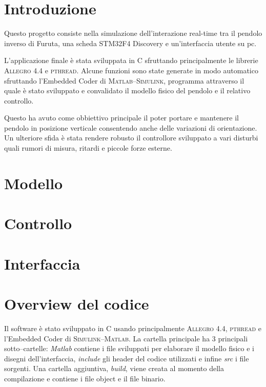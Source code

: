 
\graphicspath{{./figs/}}

\title{}
\author{Francesco Petracci e Simone Silenzi} 





 
\section{Introduzione}
Questo progetto consiste nella simulazione dell'interazione real-time tra il pendolo inverso di Furuta, una scheda STM32F4 Discovery e un'interfaccia utente su pc. 

L'applicazione finale \`e stata sviluppata in C sfruttando principalmente le librerie \textsc{Allegro} 4.4 e \textsc{pthread}. 
Alcune funzioni sono state generate in modo automatico sfruttando l'Embedded Coder di \textsc{Matlab--Simulink}, programma attraverso il quale \`e stato sviluppato e convalidato il modello fisico del pendolo e il relativo controllo.

Questo ha avuto come obbiettivo principale il poter portare e mantenere il pendolo in posizione verticale consentendo anche delle variazioni di orientazione. Un ulteriore sfida \`e stata rendere robusto il controllore sviluppato a vari disturbi quali rumori di misura, ritardi e piccole forze esterne.

%

\section{Modello}
\label{sez:modello}

\section{Controllo}
\label{sez:controllo}

\section{Interfaccia}


\section{Overview del codice}

Il software \`e stato sviluppato in C usando principalmente \textsc{Allegro} 4.4, \textsc{pthread} e l'Embedded Coder di \textsc{Simulink--Matlab}. La cartella principale ha 3 principali sotto--cartelle: \textit{Matlab} contiene i file sviluppati per elaborare il modello fisico e i disegni dell'interfaccia, \textit{include} gli header del codice utilizzati e infine \textit{src} i file sorgenti. Una cartella aggiuntiva, \textit{build}, viene creata al momento della compilazione e contiene i file object e il file binario.

